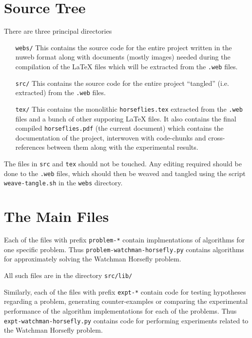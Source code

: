 \documentclass[12pt]{report}
\begin{document}
\section{Source Tree}


There are three principal directories 
\begin{itemize}
 \item[\texttt{webs/}] This contains the source code for the entire project written in the nuweb format along with documents (mostly images)
                       needed during the compilation of the \LaTeX{} files which will be extracted from the \texttt{.web} files. 
 \item[\texttt{src/}] This contains the source code for the entire project ``tangled'' (i.e. extracted) from the \texttt{.web} files. 
 \item[\texttt{tex/}] This contains the monolithic \texttt{horseflies.tex} extracted from the \texttt{.web} files and a bunch 
of other supporing \LaTeX{} files. It also contains the final compiled \texttt{horseflies.pdf} (the current document) which contains the 
documentation of the project, interwoven with code-chunks and cross-references between them along with the experimental results.  
\end{itemize}  

The files in \texttt{src} and \texttt{tex} should not be touched. Any editing required should 
be done to the \texttt{.web} files, which should then be weaved and tangled using the
script \texttt{weave-tangle.sh} in the \texttt{webs} directory. 

\section{The Main Files} 


\newchunk Each of the files with prefix \texttt{problem-*}  contain implmentations of 
 algorithms for one specific problem. Thus \texttt{problem-watchman-horsefly.py} 
 contains algorithms for approximately solving the Watchman Horsefly problem. 

 All such files are in the directory \texttt{src/lib/}

\newchunk Similarly, each of the files with prefix \texttt{expt-*} contain code
 for testing hypotheses regarding a problem, generating counter-examples or 
 comparing the experimental performance of the algorithm implementations 
 for each of the problems. Thus \texttt{expt-watchman-horsefly.py} contains 
 code for performing experiments related to the Watchman Horsefly problem. 
\end{document}
